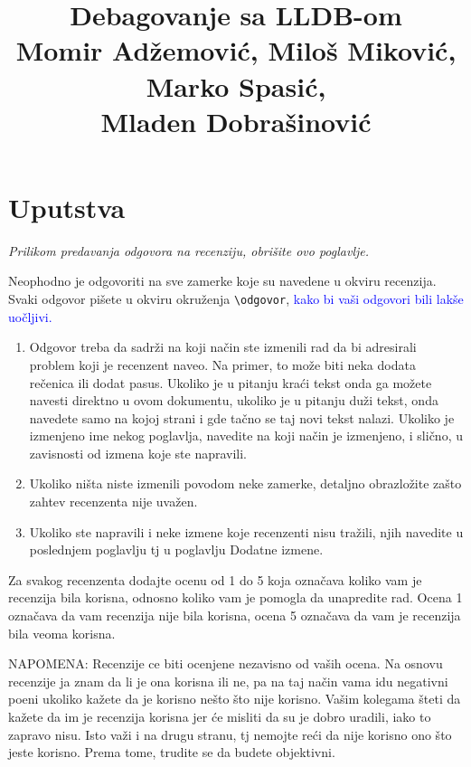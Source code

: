 \documentclass[a4paper]{report}
\newcommand{\odgovor}[1]{\textcolor{blue}{#1}}
\begin{document}
\title{Debagovanje sa LLDB-om\\ \small{Momir Adžemović, Miloš Miković, Marko Spasić,\\ Mladen Dobrašinović}}

\maketitle

\tableofcontents

\chapter{Uputstva}
\emph{Prilikom predavanja odgovora na recenziju, obrišite ovo poglavlje.}

Neophodno je odgovoriti na sve zamerke koje su navedene u okviru recenzija. Svaki odgovor pišete u okviru okruženja \verb"\odgovor", \odgovor{kako bi vaši odgovori bili lakše uočljivi.} 
\begin{enumerate}

\item Odgovor treba da sadrži na koji način ste izmenili rad da bi adresirali problem koji je recenzent naveo. Na primer, to može biti neka dodata rečenica ili dodat pasus. Ukoliko je u pitanju kraći tekst onda ga možete navesti direktno u ovom dokumentu, ukoliko je u pitanju duži tekst, onda navedete samo na kojoj strani i gde tačno se taj novi tekst nalazi. Ukoliko je izmenjeno ime nekog poglavlja, navedite na koji način je izmenjeno, i slično, u zavisnosti od izmena koje ste napravili. 

\item Ukoliko ništa niste izmenili povodom neke zamerke, detaljno obrazložite zašto zahtev recenzenta nije uvažen.

\item Ukoliko ste napravili i neke izmene koje recenzenti nisu tražili, njih navedite u poslednjem poglavlju tj u poglavlju Dodatne izmene.
\end{enumerate}

Za svakog recenzenta dodajte ocenu od 1 do 5 koja označava koliko vam je recenzija bila korisna, odnosno koliko vam je pomogla da unapredite rad. Ocena 1 označava da vam recenzija nije bila korisna, ocena 5 označava da vam je recenzija bila veoma korisna. 

NAPOMENA: Recenzije ce biti ocenjene nezavisno od vaših ocena. Na osnovu recenzije ja znam da li je ona korisna ili ne, pa na taj način vama idu negativni poeni ukoliko kažete da je korisno nešto što nije korisno. Vašim kolegama šteti da kažete da im je recenzija korisna jer će misliti da su je dobro uradili, iako to zapravo nisu. Isto važi i na drugu stranu, tj nemojte reći da nije korisno ono što jeste korisno. Prema tome, trudite se da budete objektivni. 
\end{document}
